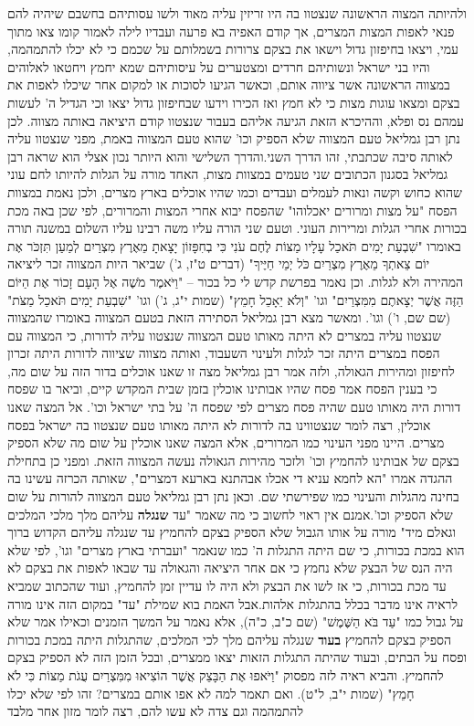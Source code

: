 \documentclass[12pt, openany]{book}
\begin{document}
ולהיותה המצוה הראשונה שנצטוו בה היו זריזין עליה מאוד ולשו עסותיהם בחשבם שיהיה להם פנאי לאפות המצות המצרים, אך קודם האפיה בא פרעה ועבדיו לילה לאמור קומו צאו מתוך עמי, ויצאו בחיפזון גדול וישאו את בצקם צרורות בשמלותם על שכמם כי לא יכלו להתמהמה, והיו בני ישראל ונשותיהם חרדים ומצטערים על עיסותיהם שמא יחמץ ויחטאו לאלוהים במצווה הראשונה אשר ציווה אותם, וכאשר הגיעו לסוכות או למקום אחר שיכלו לאפות את בצקם ומצאו עוגות מצות כי לא חמץ ואז הכירו וידעו שבחיפזון גדול יצאו וכי הגדיל ה' לעשות עמהם נס ופלא, וההיכרא הזאת הגיעה אליהם בעבור שנצטוו קודם היציאה באותה מצווה. לכן נתן רבן גמליאל טעם המצווה שלא הספיק וכו' שהוא טעם המצווה באמת, מפני שנצטוו עליה לאותה סיבה שכתבתי, זהו הדרך השני.והדרך השלישי והוא היותר נכון אצלי הוא שראה רבן גמליאל בסגנון הכתובים שני טעמים במצוות מצות, האחד מורה על הגלות להיותו לחם עוני שהוא כחוש וקשה ונאות לעמלים ועבדים וכמו שהיו אוכלים בארץ מצרים, ולכן נאמת במצוות הפסח "על מצות ומרורים יאכלוהו" שהפסח יבוא אחרי המצות והמרורים, לפי שכן באה מכת בכורות אחרי הגלות ומרירות העוני. וטעם שני הורה עליו משה רבינו עליו השלום במשנה תורה באומרו "שִׁבְעַת יָמִים תֹּאכַל עָלָיו מַצּוֹת לֶחֶם עֹנִי כִּי בְחִפָּזוֹן יָצָאתָ מֵאֶרֶץ מִצְרַיִם לְמַעַן תִּזְכֹּר אֶת יוֹם צֵאתְךָ מֵאֶרֶץ מִצְרַיִם כֹּל יְמֵי חַיֶּיךָ" (דברים ט"ז, ג') שביאר היות המצווה זכר ליציאה המהירה ולא לגלות. וכן נאמר בפרשת קדש לי כל בכור – "וַיֹּאמֶר מֹשֶׁה אֶל הָעָם זָכוֹר אֶת הַיּוֹם הַזֶּה אֲשֶׁר יְצָאתֶם מִמִּצְרַיִם" וגו' "וְלֹא יֵאָכֵל חָמֵץ" (שמות י"ג, ג') וגו' "שִׁבְעַת יָמִים תֹּאכַל מַצֹּת" (שם שם, ו') וגו'. ומאשר מצא רבן גמליאל הסתירה הזאת בטעם המצווה באומרו שהמצווה שנצטוו עליה במצרים לא היתה מאותו טעם המצווה שנצטוו עליה לדורות, כי המצווה עם הפסח במצרים היתה זכר לגלות ולעינוי השעבוד, ואותה מצווה שציווה לדורות היתה זכרון לחיפזון ומהירות הגאולה, ולזה אמר רבן גמליאל מצה זו שאנו אוכלים בדור הזה על שום מה, כי בענין הפסח אמר פסח שהיו אבותינו אוכלין בזמן שבית המקדש קיים, וביאר בו שפסח דורות היה מאותו טעם שהיה פסח מצרים לפי שפסח ה' על בתי ישראל וכו'. אל המצה שאנו אוכלין, רצה לומר שנצטווינו בה לדורות לא היתה מאותו טעם שנצטוו בה ישראל בפסח מצרים. היינו מפני העינוי כמו המרורים, אלא המצה שאנו אוכלין על שום מה שלא הספיק בצקם של אבותינו להחמיץ וכו' ולזכר מהירות הגאולה נעשה המצווה הזאת. ומפני כן בתחילת ההגדה אמרו "הא לחמא עניא די אכלו אבהתנא בארעא דמצרים", שאותה הכרזה עשינו בה בחינה מהגלות והעינוי כמו שפירשתי שם. וכאן נתן רבן גמליאל טעם המצווה להורות על שום שלא הספיק וכו'.אמנם אין ראוי לחשוב כי מה שאמר "עד \textrm{\textbf{שנגלה}} עליהם מלך מלכי המלכים וגאלם מיד" מורה על אותו הגבול שלא הספיק בצקם להחמיץ עד שנגלה עליהם הקדוש ברוך הוא במכת בכורות, כי שם היתה התגלות ה' כמו שנאמר "ועברתי בארץ מצרים" וגו', לפי שלא היה הנס של הבצק שלא נחמץ כי אם אחר היציאה והגאולה עד שבאו לאפות את בצקם לא עד מכת בכורות, כי אז לשו את הבצק ולא היה לו עדיין זמן להחמיץ, ועוד שהכתוב שמביא לראיה אינו מדבר בכלל בהתגלות אלהות.אבל האמת בוא שמילת "עד" במקום הזה אינו מורה על גבול כמו "עַד בֹּא הַשֶּׁמֶשׁ" (שם כ"ב, כ"ה), אלא נאמר על המשך הזמנים וכאילו אמר שלא הספיק בצקם להחמיץ \textrm{\textbf{בעוד}} שנגלה עליהם מלך לכי המלכים, שהתגלות היתה במכת בכורות ופסח על הבתים, ובעוד שהיתה התגלות הזאות יצאו ממצרים, ובכל הזמן הזה לא הספיק בצקם להחמיץ. והביא ראיה לזה מפסוק "וַיֹּאפוּ אֶת הַבָּצֵק אֲשֶׁר הוֹצִיאוּ מִמִּצְרַיִם עֻגֹת מַצּוֹת כִּי לֹא חָמֵץ" (שמות י"ב, ל"ט). ואם תאמר למה לא אפו אותם במצרים? זהו לפי שלא יכלו להתמהמה וגם צדה לא עשו להם, רצה לומר מזון אחר מלבד 
\end{document}
